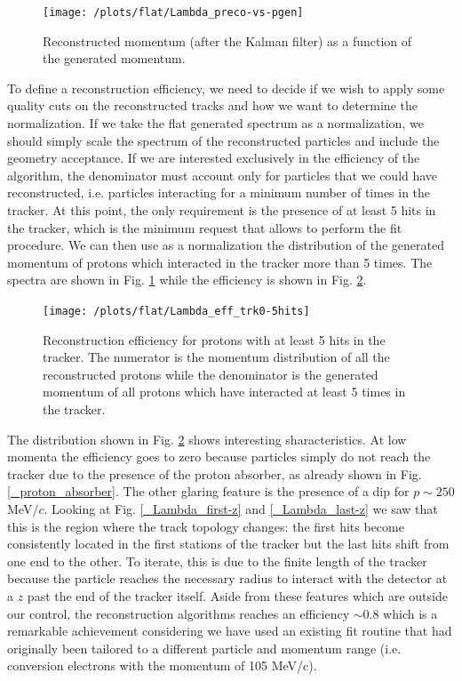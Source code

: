 \documentclass[12pt,a4paper,openright, oneside, titlepage]{book} %
\begin{document}
\begin{figure}[h!]
\centering
\texttt{[image: /plots/flat/Lambda\_preco-vs-pgen]}
\caption[Reconstructed vs generated momentum (flat protons)]
{Reconstructed momentum (after the Kalman filter) as a function of the generated momentum.}
\label{_Lambda_preco-vs-pgen}
\end{figure}

\noindent To define a reconstruction efficiency, 
we need to decide if we wish to apply some quality cuts 
on the reconstructed tracks and how we want to determine the normalization. 
If we take the flat generated spectrum as a normalization, 
we should simply scale the spectrum of the reconstructed particles 
and include the geometry acceptance. 
If we are interested exclusively in the efficiency of the algorithm, 
the denominator must account only for particles that we could have reconstructed, 
i.e. particles interacting for a minimum number of times in the tracker. 
At this point, the only requirement is the presence of at least 5 hits in the tracker, 
which is the minimum request that allows to perform the fit procedure. 
We can then use as a normalization the distribution of the generated momentum 
of protons which interacted in the tracker more than 5 times. 
The spectra are shown in Fig. \ref{_Lambda_preco-vs-pgen} 
while the efficiency is shown in Fig. \ref{_Lambda_eff_trk0-5hits}.\\

\begin{figure}[h!]
\centering
\texttt{[image: /plots/flat/Lambda\_eff\_trk0-5hits]}
\caption[Algorithm efficiency]{Reconstruction efficiency for protons with at least 5 hits in the tracker. 
The numerator is the momentum distribution of all the reconstructed protons
while the denominator is the generated momentum of all protons which have
interacted at least 5 times in the tracker.}
\label{_Lambda_eff_trk0-5hits}
\end{figure}

\noindent The distribution shown in Fig. \ref{_Lambda_eff_trk0-5hits} shows interesting sharacteristics. 
At low momenta the efficiency goes to zero because particles simply do not reach the tracker 
due to the presence of the proton absorber, as already shown in Fig. \ref{_proton_absorber}. 
The other glaring feature is the presence of a dip for $p\sim250$ MeV$/c$. 
Looking at Fig. \ref{_Lambda_first-z} and \ref{_Lambda_last-z} 
we saw that this is the region where the track topology changes: 
the first hits become consistently located in the first stations of the tracker 
but the last hits shift from one end to the other. 
To iterate, this is due to the finite length of the tracker because the particle reaches 
the necessary radius to interact with the detector at a $z$ past the end of the tracker itself.
Aside from these features which are outside our control, 
the reconstruction algorithms reaches an efficiency $\sim 0.8$ 
which is a remarkable achievement considering we have used an existing fit routine 
that had originally been tailored to a different particle and momentum range
(i.e. conversion electrons with the momentum of 105 MeV/c).\\
\end{document}
